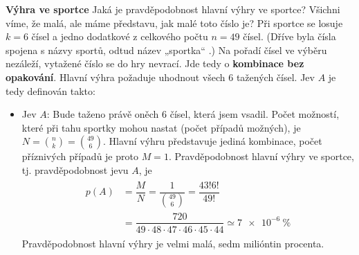 \begin{mdframed}[style=mdexam]
  \begin{example}\label{mai:exam052}
    \textbf{Výhra ve sportce}\newline
    Jaká je pravděpodobnost hlavní výhry ve sportce? Všichni víme, že malá, ale máme představu, jak
    malé toto číslo je? Při sportce se losuje \(k = 6\) čísel a jedno dodatkové z celkového počtu
    \(n = 49\) čísel. (Dříve byla čísla spojena s názvy sportů, odtud název „sportka“ .) Na pořadí
    čísel ve výběru nezáleží, vytažené číslo se do hry nevrací. Jde tedy o \textbf{kombinace bez
    opakování}. Hlavní výhra požaduje uhodnout všech \num{6} tažených čísel. Jev \(A\) je tedy
    definován takto:
    
    \begin{itemize}[leftmargin=10pt,noitemsep]
      \item Jev \(A\): Bude taženo právě oněch \num{6} čísel, která jsem vsadil. Počet možností,
            které při tahu sportky mohou nastat (počet případů možných), je \(N = \binom{n}{k} =
            \binom{49}{6}\). Hlavní výhru představuje jediná kombinace, počet příznivých případů je
            proto \(M = 1\). Pravděpodobnost hlavní výhry ve sportce, tj. pravděpodobnost jevu
            \(A\), je
            \begin{gather*}
              \begin{align*}
              p(A) &= \dfrac{M}{N} = \dfrac{1}{\binom{49}{6}} = \dfrac{43!6!}{49!}   \\
                   &= \dfrac{720}{49\cdot48\cdot47\cdot46\cdot45\cdot44} 
                    \simeq \SI{7e-6}{\percent}
              \end{align*}    
            \end{gather*}
            Pravděpodobnost hlavní výhry je velmi malá, sedm milióntin procenta.
            

\end{itemize}
\end{example}
\end{mdframed}
